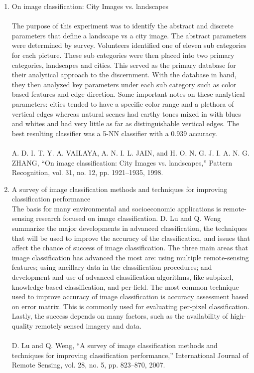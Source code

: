 \documentclass{article}
\begin{document}
\small
\begin{enumerate}
    \item On image classification: City Images vs. landscapes \\
    \\
    The purpose of this experiment was to identify the abstract and discrete parameters that define a landscape vs a city image. The abstract parameters were determined by survey. Volunteers identified one of eleven sub categories for each picture. These sub categories were then placed into two primary categories, landscapes and cities. This served as the primary database for their analytical approach to the discernment. With the database in hand, they then analyzed key parameters under each sub category such as color based features and edge direction. Some important notes on these analytical parameters: cities tended to have a specific color range and a plethora of vertical edges whereas natural scenes had earthy tones mixed in with blues and whites and had very little as far as distinguishable vertical edges. The best resulting classifier was a 5-NN classifier with a 0.939 accuracy.\\
    \\
    A. D. I. T. Y. A. VAILAYA, A. N. I. L. JAIN, and H. O. N. G. J. I. A. N. G. ZHANG, “On image classification: City Images vs. landscapes,” Pattern Recognition, vol. 31, no. 12, pp. 1921–1935, 1998. \\
    \item A survey of image classification methods and techniques for improving classification performance \\
    
    The basis for many environmental and socioeconomic applications is remote-sensing research focused on image classification. D. Lu and Q. Weng summarize the major developments in advanced classification, the techniques that will be used to improve the accuracy of the classification, and issues that affect the chance of success of image classification. The three main areas that image classification has advanced the most are: using multiple remote-sensing features; using ancillary data in the classification procedures; and development and use of advanced classification algorithms, like subpixel, knowledge-based classification, and per-field. The most common technique used to improve accuracy of image classification is accuracy assessment based on error matrix. This is commonly used for evaluating per-pixel classification. Lastly, the success depends on many factors, such as the availability of high-quality remotely sensed imagery and data.   \\  
    \\
    D. Lu and Q. Weng, “A survey of image classification methods and techniques for improving classification performance,” International Journal of Remote Sensing, vol. 28, no. 5, pp. 823–870, 2007. \\
    

\end{enumerate}
\end{document}
